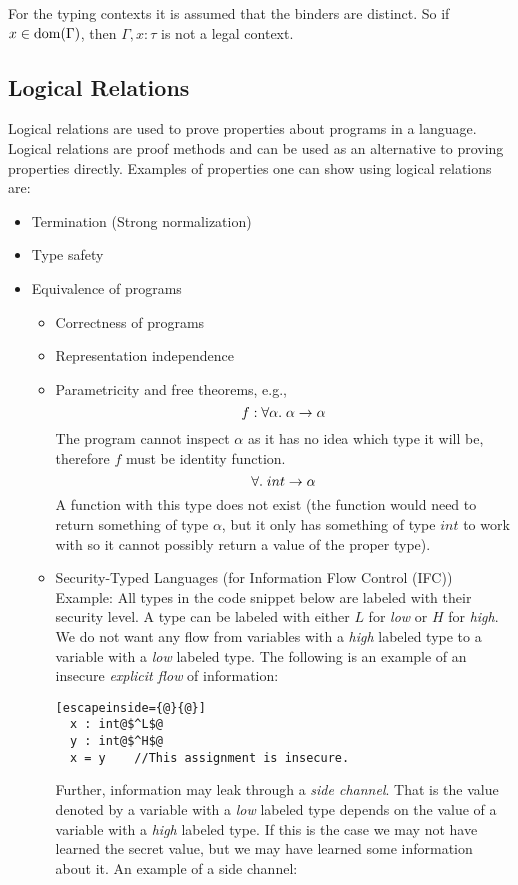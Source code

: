 For the typing contexts it is assumed that the binders are distinct. So if $x \in \operatorname{dom}(\Gamma)$, then $\Gamma , x : \tau$ is not a legal context.
\subsection*{Logical Relations}
Logical relations are used to prove properties about programs in a language. Logical relations are proof methods and can be used as an alternative to proving properties directly. Examples of properties one can show using logical relations are:
\begin{itemize}
\item Termination (Strong normalization)
\item Type safety
\item Equivalence of programs
  \begin{itemize}
  \item Correctness of programs
  \item Representation independence
  \item Parametricity and free theorems, e.g.,
    \[
    f: \forall \alpha. \;  \alpha \rightarrow \alpha
    \]
    The program cannot inspect $\alpha$ as it has no idea which type it will be, therefore $f$ must be identity function.
    \[
    \forall. \;  int \rightarrow \alpha
    \]
    A function with this type does not exist (the function would need to return something of type $\alpha$, but it only has something of type $int$ to work with so it cannot possibly return a value of the proper type).
  \item Security-Typed Languages (for Information Flow Control (IFC))\\
        Example: All types in the code snippet below are labeled with their security level. A type can be labeled with either $L$ for \emph{low} or $H$ for \emph{high}. We do not want any flow from variables with a \emph{high} labeled type to a variable with a \emph{low} labeled type. The following is an example of an insecure \emph{explicit flow} of information:
        \begin{lstlisting}[escapeinside={@}{@}]
  x : int@$^L$@
  y : int@$^H$@
  x = y    //This assignment is insecure.
        \end{lstlisting}
Further, information may leak through a \emph{side channel}. That is the value denoted by a variable with a \emph{low} labeled type depends on the value of a variable with a \emph{high} labeled type. If this is the case we may not have learned the secret value, but we may have learned some information about it. An example of a side channel:

\end{itemize}
\end{itemize}
